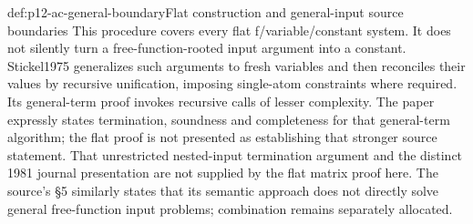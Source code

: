\begin{proofboundary}{def:p12-ac-general-boundary}{Flat construction and general-input source boundaries}
This procedure covers every flat f/variable/constant system. It does
not silently turn a free-function-rooted input argument into a constant.
Stickel1975 generalizes such arguments to fresh variables and then
reconciles their values by recursive unification, imposing single-atom
constraints where required. Its general-term proof invokes recursive
calls of lesser complexity. The paper expressly states termination,
soundness and completeness for that general-term algorithm; the flat
proof is not presented as establishing that stronger source statement.
That unrestricted nested-input termination
argument and the distinct 1981 journal presentation are not supplied
by the flat matrix proof here. The source's \S5 similarly states
that its semantic approach does not directly solve general free-function
input problems; combination remains separately allocated.
\cite[pp.~73--76]{Stickel1975AC}
\cite[pp.~504,512--513]{BaaderSnyder2001}
\end{proofboundary}
